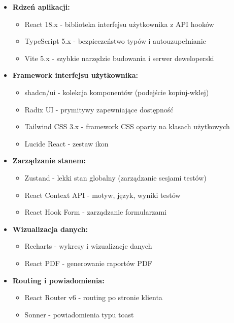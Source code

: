 \documentclass[12pt,a4paper]{article}
\begin{document}
\begin{tcolorbox}[colback=blue!5!white,colframe=blue!75!black,title=Stos technologiczny frontendu,breakable]
\begin{itemize}
    \item \textbf{Rdzeń aplikacji:}
    \begin{itemize}
        \item React 18.x - biblioteka interfejsu użytkownika z API hooków
        \item TypeScript 5.x - bezpieczeństwo typów i autouzupełnianie
        \item Vite 5.x - szybkie narzędzie budowania i serwer deweloperski
    \end{itemize}
    
    \item \textbf{Framework interfejsu użytkownika:}
    \begin{itemize}
        \item shadcn/ui - kolekcja komponentów (podejście kopiuj-wklej)
        \item Radix UI - prymitywy zapewniające dostępność
        \item Tailwind CSS 3.x - framework CSS oparty na klasach użytkowych
        \item Lucide React - zestaw ikon
    \end{itemize}
    
    \item \textbf{Zarządzanie stanem:}
    \begin{itemize}
        \item Zustand - lekki stan globalny (zarządzanie sesjami testów)
        \item React Context API - motyw, język, wyniki testów
        \item React Hook Form - zarządzanie formularzami
    \end{itemize}
    
    \item \textbf{Wizualizacja danych:}
    \begin{itemize}
        \item Recharts - wykresy i wizualizacje danych
        \item React PDF - generowanie raportów PDF
    \end{itemize}
    
    \item \textbf{Routing i powiadomienia:}
    \begin{itemize}
        \item React Router v6 - routing po stronie klienta
        \item Sonner - powiadomienia typu toast
    \end{itemize}
\end{itemize}
\end{tcolorbox}
\end{document}
